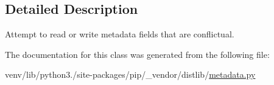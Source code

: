 \subsection{Detailed Description}
\begin{DoxyVerb}Attempt to read or write metadata fields that are conflictual.\end{DoxyVerb}
 

The documentation for this class was generated from the following file\+:\begin{DoxyCompactItemize}
\item 
venv/lib/python3./site-\/packages/pip/\+\_\+vendor/distlib/\hyperlink{pip_2__vendor_2distlib_2metadata_8py}{metadata.\+py}\end{DoxyCompactItemize}
